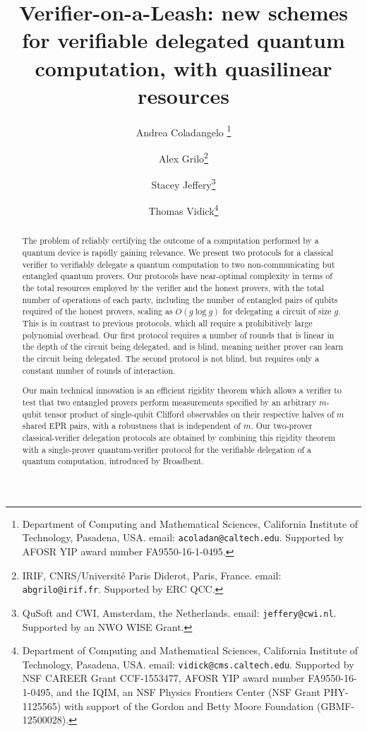\documentclass[11pt,letter]{article}
\theoremstyle{remark}
\theoremstyle{definition}
\begin{document}
\title{Verifier-on-a-Leash: new schemes for verifiable delegated quantum computation, with quasilinear resources}

\author{Andrea Coladangelo \thanks{Department of Computing and Mathematical Sciences, California Institute of Technology, Pasadena, USA. email: \texttt{acoladan@caltech.edu}. Supported by AFOSR YIP award number FA9550-16-1-0495.}
  \and Alex Grilo\thanks{IRIF, CNRS/Universit\'e Paris Diderot, Paris, France. email: \texttt{abgrilo@irif.fr}. Supported by ERC QCC.}
  \and Stacey Jeffery\thanks{QuSoft and CWI, Amsterdam, the Netherlands. email: \texttt{jeffery@cwi.nl}. Supported by an NWO WISE Grant.}
  \and Thomas Vidick\thanks{Department of Computing and Mathematical Sciences,
    California Institute of Technology, Pasadena, USA. email:
    \texttt{vidick@cms.caltech.edu}. Supported by NSF CAREER Grant CCF-1553477, AFOSR YIP award number FA9550-16-1-0495, and the IQIM, an NSF Physics Frontiers Center (NSF Grant PHY-1125565) with support of the Gordon and Betty Moore Foundation (GBMF-12500028).}}


\date{}
\maketitle

\begin{abstract}
The problem of reliably certifying the outcome of a computation performed by a quantum device is rapidly gaining relevance. We present two protocols for a classical verifier to verifiably delegate a quantum computation to two non-communicating but entangled quantum provers. Our protocols have near-optimal complexity in terms of the total resources employed by the verifier and the honest provers, with the total number of operations of each party, including the number of entangled pairs of qubits required of the honest provers, scaling as $O(g\log g)$ for delegating a circuit of size $g$. This is in contrast to previous protocols, which all require a prohibitively large polynomial overhead. Our first protocol requires a number of rounds that is linear in the depth of the circuit being delegated, and is blind, meaning neither prover can learn the circuit being delegated. The second protocol is not blind, but requires only a constant number of rounds of interaction. 

Our main technical innovation is an efficient rigidity theorem which allows a verifier to test that two entangled provers perform measurements specified by an arbitrary $m$-qubit tensor product of single-qubit Clifford observables on their respective halves of $m$ shared EPR pairs, with a robustness that is independent of $m$. Our two-prover classical-verifier delegation protocols are obtained by combining this rigidity theorem with a single-prover quantum-verifier protocol for the verifiable delegation of a quantum computation, introduced by Broadbent.
\end{abstract}
\end{document}
